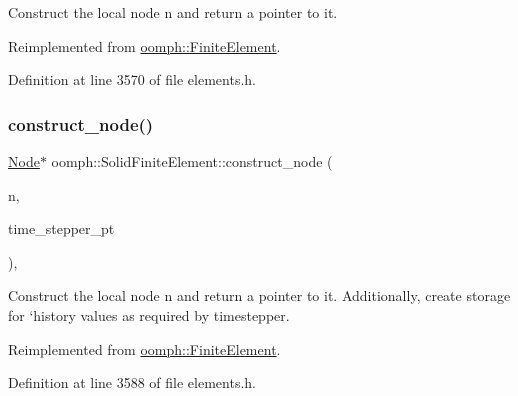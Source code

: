 Construct the local node n and return a pointer to it. 



Reimplemented from \hyperlink{classoomph_1_1FiniteElement_a22ff82b3c3a2c0f204090fcb31bea1f5}{oomph\+::\+Finite\+Element}.



Definition at line 3570 of file elements.\+h.

\mbox{\label{classoomph_1_1SolidFiniteElement_ad7aaabe98172d2b4f0c0bab986f8f745}} 
\subsubsection{\texorpdfstring{construct\+\_\+node()}{construct\_node()}\hspace{0.1cm}{\footnotesize\ttfamily [2/2]}}
{\footnotesize\ttfamily \hyperlink{classoomph_1_1Node}{Node}$\ast$ oomph\+::\+Solid\+Finite\+Element\+::construct\+\_\+node (\begin{DoxyParamCaption}\item[{const unsigned \&}]{n,  }\item[{\hyperlink{classoomph_1_1TimeStepper}{Time\+Stepper} $\ast$const \&}]{time\+\_\+stepper\+\_\+pt }\end{DoxyParamCaption})\hspace{0.3cm}{\ttfamily [inline]}, {\ttfamily [virtual]}}



Construct the local node n and return a pointer to it. Additionally, create storage for `history\textquotesingle{} values as required by timestepper. 



Reimplemented from \hyperlink{classoomph_1_1FiniteElement_ab340a73573761cfceb22b2fca985026a}{oomph\+::\+Finite\+Element}.



Definition at line 3588 of file elements.\+h.

\mbox{\label{classoomph_1_1SolidFiniteElement_ac87b12010837978f9a419c8097721af4}} 
